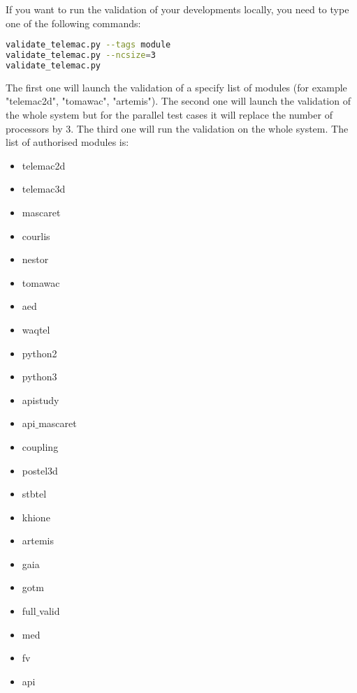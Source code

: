 If you want to run the validation of your developments locally, you need to type one of the following commands:
\begin{lstlisting}[language=bash]
validate_telemac.py --tags module
validate_telemac.py --ncsize=3
validate_telemac.py
\end{lstlisting}
The first one will launch the validation of a specify list of modules (for example
"telemac2d", "tomawac", "artemis").
The second one will launch the validation of the whole system but for the
parallel test cases it will replace the number of processors by 3.
The third one will run the validation on the whole system.
The list of authorised modules is:
\begin{itemize}
\item telemac2d
\item telemac3d
\item mascaret
\item courlis
\item nestor
\item tomawac
\item aed
\item waqtel
\item python2
\item python3
\item apistudy
\item api$\_$mascaret
\item coupling
\item postel3d
\item stbtel
\item khione
\item artemis
\item gaia
\item gotm
\item full$\_$valid
\item med
\item fv
\item api
\end{itemize}

%
%
%
%
%
%
%
%
